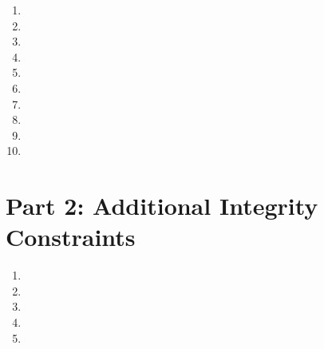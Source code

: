 \documentclass{article}
\begin{document}
\begin{enumerate}

\item   %

\item   %

\item   %

\item   %

\item   %

\item   %

\item   %

\item   %

\item   %

\item   %

\end{enumerate}



\newpage
\section*{Part 2: Additional Integrity Constraints}

\begin{enumerate}

\item   %

\item   %

\item   %

\item   %

\item   %

\end{enumerate}
\end{document}
